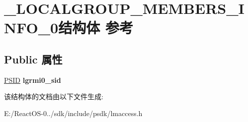 \hypertarget{struct___l_o_c_a_l_g_r_o_u_p___m_e_m_b_e_r_s___i_n_f_o__0}{}\section{\+\_\+\+L\+O\+C\+A\+L\+G\+R\+O\+U\+P\+\_\+\+M\+E\+M\+B\+E\+R\+S\+\_\+\+I\+N\+F\+O\+\_\+0结构体 参考}
\label{struct___l_o_c_a_l_g_r_o_u_p___m_e_m_b_e_r_s___i_n_f_o__0}
\subsection*{Public 属性}
\begin{DoxyCompactItemize}
\item 
\mbox{\label{struct___l_o_c_a_l_g_r_o_u_p___m_e_m_b_e_r_s___i_n_f_o__0_ae0cf53dfe9292d04dcf0736e22a59e4f}} 
\hyperlink{struct___s_i_d}{P\+S\+ID} {\bfseries lgrmi0\+\_\+sid}
\end{DoxyCompactItemize}


该结构体的文档由以下文件生成\+:\begin{DoxyCompactItemize}
\item 
E\+:/\+React\+O\+S-\/0../sdk/include/psdk/lmaccess.\+h\end{DoxyCompactItemize}
